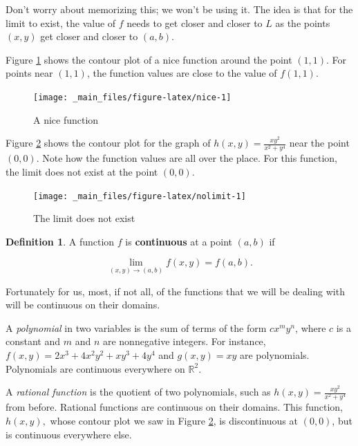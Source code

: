 \documentclass[
]{book}
\theoremstyle{definition}
\newtheorem{definition}{Definition}[chapter]
\theoremstyle{definition}
\theoremstyle{definition}
\theoremstyle{definition}
\theoremstyle{remark}
\begin{document}
Don't worry about memorizing this; we won't be using it. The idea is that for the limit to exist, the value of \(f\) needs to get closer and closer to \(L\) as the points \((x,y)\) get closer and closer to \((a,b)\).

Figure \ref{fig:nice} shows the contour plot of a nice function around the point \((1,1)\). For points near \((1,1)\), the function values are close to the value of \(f(1,1)\).

\begin{figure}

{\centering \texttt{[image: \_main\_files/figure-latex/nice-1]} 

}

\caption{A nice function}\label{fig:nice}
\end{figure}

Figure \ref{fig:nolimit} shows the contour plot for the graph of \(h(x,y)=\frac{xy^2}{x^2+y^4}\) near the point \((0,0).\) Note how the function values are all over the place. For this function, the limit does not exist at the point \((0,0)\).

\begin{figure}

{\centering \texttt{[image: \_main\_files/figure-latex/nolimit-1]} 

}

\caption{The limit does not exist}\label{fig:nolimit}
\end{figure}

\begin{defbox}

\begin{definition}
A function \(f\) is \textbf{continuous} at a point \((a,b)\) if

\[\lim_{(x,y)\to(a,b)}f(x,y)=f(a,b).\]
\end{definition}

\end{defbox}

Fortunately for us, most, if not all, of the functions that we will be dealing with will be continuous on their domains.

A \emph{polynomial} in two variables is the sum of terms of the form \(cx^my^n\), where \(c\) is a constant and \(m\) and \(n\) are nonnegative integers. For instance,
\(f(x,y)=2x^3+4x^2y^2+xy^3+4y^4\) and \(g(x,y)=xy\) are polynomials. Polynomials are continuous everywhere on \(\mathbb{R}^2\).

A \emph{rational function} is the quotient of two polynomials, such as \(h(x,y)=\frac{xy^2}{x^2+y^4}\) from before. Rational functions are continuous on their domains. This function, \(h(x,y),\) whose contour plot we saw in Figure \ref{fig:nolimit}, is discontinuous at \((0,0)\), but is continuous everywhere else.
\end{document}
